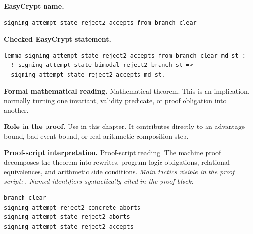 \begin{formaltheorem}
\noindent\textbf{EasyCrypt name.}
\begin{lstlisting}[language=EasyCrypt,basicstyle=\ttfamily\scriptsize]
signing_attempt_state_reject2_accepts_from_branch_clear
\end{lstlisting}
\noindent\textbf{Checked EasyCrypt statement.}
\begin{lstlisting}[language=EasyCrypt,basicstyle=\ttfamily\scriptsize]
lemma signing_attempt_state_reject2_accepts_from_branch_clear md st :
  ! signing_attempt_state_bimodal_reject2_branch st =>
  signing_attempt_state_reject2_accepts md st.
\end{lstlisting}
\noindent\textbf{Formal mathematical reading.}
Mathematical theorem. This is an implication, normally turning one invariant, validity predicate, or proof obligation into another.

\noindent\textbf{Role in the proof.}
Use in this chapter. It contributes directly to an advantage bound, bad-event bound, or real-arithmetic composition step.

\noindent\textbf{Proof-script interpretation.}
Proof-script reading. The machine proof decomposes the theorem into rewrites, program-logic obligations, relational equivalences, and arithmetic side conditions.
\emph{Main tactics visible in the proof script:} .
\emph{Named identifiers syntactically cited in the proof block:}
\begin{lstlisting}[language=EasyCrypt,basicstyle=\ttfamily\scriptsize]
branch_clear
signing_attempt_reject2_concrete_aborts
signing_attempt_state_reject2_aborts
signing_attempt_state_reject2_accepts
\end{lstlisting}

\end{formaltheorem}

